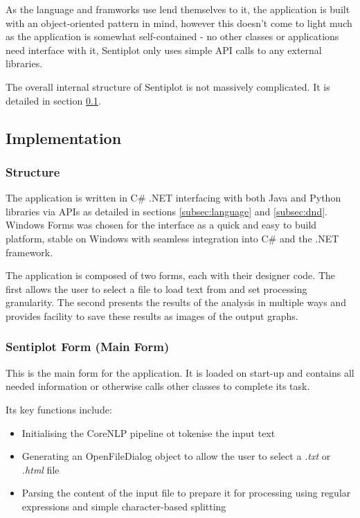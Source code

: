 \documentclass{article}
\begin{document}
        As the language and framworks use lend themselves to it, the application is built with an object-oriented pattern in mind, however this doesn't come to light much as the application is somewhat self-contained - no other classes or applications need interface with it, Sentiplot only uses simple API calls to any external libraries.

        The overall internal structure of Sentiplot is not massively complicated. It is detailed in section \ref{subsec:implementation}.
    \subsection{Implementation}
    \label{subsec:implementation}
        \subsubsection{Structure}
            The application is written in C\# .NET interfacing with both Java and Python libraries via APIs as detailed in sections \ref{subsec:language} and \ref{subsec:dnd}. Windows Forms was chosen for the interface as a quick and easy to build platform, stable on Windows with seamless integration into C\# and the .NET framework.

            The application is composed of two forms, each with their designer code. The first allows the user to select a file to load text from and set processing granularity. The second presents the results of the analysis in multiple ways and provides facility to save these results as images of the output graphs.
        \subsubsection{Sentiplot Form (Main Form)}
            This is the main form for the application. It is loaded on start-up and contains all needed information or otherwise calls other classes to complete its task.

            Its key functions include:
            \begin{itemize}
                \item Initialising the CoreNLP pipeline ot tokenise the input text
                \item Generating an OpenFileDialog object to allow the user to select a \emph{.txt} or \emph{.html} file
                \item Parsing the content of the input file to prepare it for processing using regular expressions and simple character-based splitting
            \end{itemize}
\end{document}
